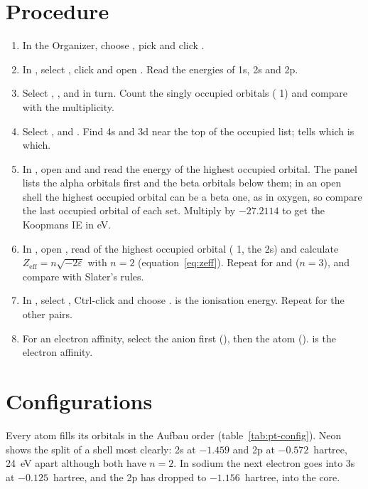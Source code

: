 \section{Procedure}
\begin{enumerate}
	\item In the Organizer, choose , pick  and click .
	\item In , select , click  and open . Read the energies of 1s, 2s and 2p.
	\item Select , ,  and  in turn. Count the singly occupied orbitals ( 1) and compare with the multiplicity.
	\item Select ,  and . Find 4s and 3d near the top of the occupied list;  tells which is which.
	\item In , open  and  and read the energy of the highest occupied orbital. The  panel lists the alpha orbitals first and the beta orbitals below them; in an open shell the highest occupied orbital can be a beta one, as in oxygen, so compare the last occupied orbital of each set. Multiply by $-27.2114$ to get the Koopmans IE in eV.
	\item In , open , read  of the highest occupied orbital ( 1, the 2s) and calculate $Z_\mathrm{eff} = n\sqrt{-2\varepsilon}$ with $n = 2$ (equation~\eqref{eq:zeff}). Repeat for  and  ($n = 3$), and compare with Slater's rules.
	\item In , select , Ctrl-click  and choose .  is the ionisation energy. Repeat for the other pairs.
	\item For an electron affinity, select the anion first (), then the atom ().  is the electron affinity.
\end{enumerate}

\section{Configurations}
Every atom fills its orbitals in the Aufbau order (table~\ref{tab:pt-config}). Neon shows the split of a shell most clearly: 2s at $-1.459$ and 2p at $-0.572$~hartree, 24~eV apart although both have $n = 2$. In sodium the next electron goes into 3s at $-0.125$~hartree, and the 2p has dropped to $-1.156$~hartree, into the core.

